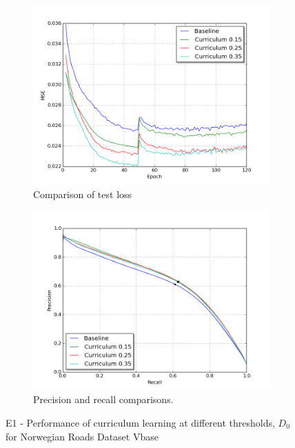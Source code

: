 \begin{figure}
\begin{subfigure}{0.48\textwidth}
\includegraphics[width=\linewidth]{figs/E1/E1-lc.png}
\caption{Comparison of test loss} \label{fig:E1_curr_norway_loss}
\end{subfigure}
\hspace*{\fill} %
\begin{subfigure}{0.48\textwidth}
\includegraphics[width=\linewidth]{figs/E1/E1-pr.png}
\caption{Precision and recall comparisons.} \label{fig:E1_curr_norway_pr}
\end{subfigure}
\hspace*{\fill} %
\caption{E1 - Performance of curriculum learning at different thresholds, $D_{0}$ for Norwegian Roads Dataset Vbase} \label{fig:E1_curriculum_norway}
\end{figure}

